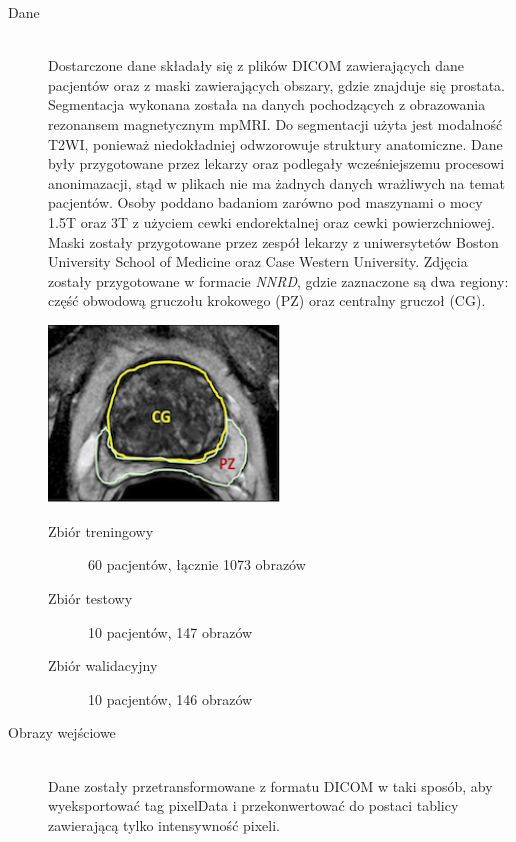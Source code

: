 \documentclass[a4paper,11pt,twoside]{report}
\theoremstyle{definition}
\begin{document}
\begin{description}
	\item [Dane] \hfill \\
	Dostarczone dane składały się z plików DICOM zawierających dane pacjentów oraz z maski zawierających obszary, gdzie znajduje się prostata. Segmentacja wykonana została na danych pochodzących z obrazowania rezonansem magnetycznym mpMRI. Do segmentacji użyta jest modalność T2WI, ponieważ niedokładniej odwzorowuje struktury anatomiczne. Dane były przygotowane przez lekarzy oraz podlegały wcześniejszemu procesowi anonimazacji, stąd w plikach nie ma żadnych danych wrażliwych na temat pacjentów. Osoby poddano badaniom zarówno pod maszynami o mocy 1.5T oraz 3T z użyciem cewki endorektalnej oraz cewki powierzchniowej. Maski zostały przygotowane  przez zespół lekarzy z uniwersytetów Boston University School of Medicine oraz Case Western University. Zdjęcia zostały przygotowane w formacie \textit{NNRD}, gdzie zaznaczone są dwa regiony: część obwodową gruczołu krokowego (PZ) oraz centralny gruczoł (CG). 
	
	\begin{minipage}[h]{\linewidth}
		\centering
		\includegraphics[width=0.5\textwidth]{segmentation/prostate_seg.png}
	\end{minipage}
	
	\begin{description}
		\item[Zbiór treningowy] 60 pacjentów, łącznie 1073 obrazów
		\item[Zbiór testowy] 10 pacjentów, 147 obrazów
		\item[Zbiór walidacyjny] 10 pacjentów, 146 obrazów
	\end{description}


	\item [Obrazy wejściowe] \hfill \\
	Dane zostały przetransformowane z formatu DICOM w taki sposób, aby wyeksportować tag pixelData i przekonwertować do postaci tablicy zawierającą tylko intensywność pixeli.
	

\end{description}
\end{document}
